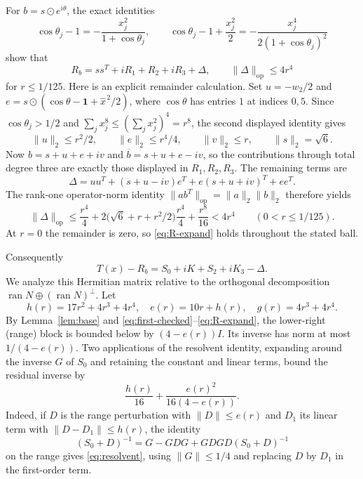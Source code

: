 \documentclass[11pt]{article}
\newcommand{\ran}{\operatorname{ran}}
\newcommand{\Op}{\mathrm{op}}
\begin{document}
For $b=s\odot e^{i\theta}$, the exact identities
\[
 \cos\theta_j-1=-\frac{x_j^2}{1+\cos\theta_j},\qquad
 \cos\theta_j-1+\frac{x_j^2}{2}
 =-\frac{x_j^4}{2(1+\cos\theta_j)^2}
\]
show that
\begin{equation}\label{eq:R-expand}
 R_b=ss^T+iR_1+R_2+iR_3+\Delta,
 \qquad\|\Delta\|_\Op\le4r^4
\end{equation}
for $r\le1/125$. Here is an explicit remainder calculation. Set
$u=-w_2/2$ and
$e=s\odot(\cos\theta-\mathbf1+\widehat x^{\,2}/2)$,
where $\cos\theta$ has entries $1$ at indices $0,5$.
Since $\cos\theta_j>1/2$ and $\sum_jx_j^8\le
(\sum_jx_j^2)^4=r^8$, the second displayed identity gives
\[
 \|u\|_2\le r^2/2,\qquad
 \|e\|_2\le r^4/4,\qquad
 \|v\|_2\le r,\qquad \|s\|_2=\sqrt6.
\]
Now $b=s+u+e+iv$ and $\overline b=s+u+e-iv$, so the
contributions through total degree three are exactly those displayed
in $R_1,R_2,R_3$. The remaining terms are
\[
 \Delta=uu^T+(s+u-iv)e^T+e(s+u+iv)^T+ee^T.
\]
The rank-one operator-norm identity $\|ab^T\|_\Op=\|a\|_2\|b\|_2$
therefore yields
\[
 \|\Delta\|_\Op
 \le \frac{r^4}{4}
 +2\bigl(\sqrt6+r+r^2/2\bigr)\frac{r^4}{4}
 +\frac{r^8}{16}<4r^4
 \qquad(0<r\le1/125).
\]
At $r=0$ the remainder is zero, so \eqref{eq:R-expand} holds
throughout the stated ball.

Consequently
\begin{equation}\label{eq:Schur-matrix}
 T(x)-R_b=S_0+iK+S_2+iK_3-\Delta.
\end{equation}
We analyze this Hermitian matrix relative to the orthogonal decomposition $\ran N\oplus(\ran N)^\perp$. Let
\begin{equation}\label{eq:error-def}
 h(r)=17r^2+4r^3+4r^4,\quad
 e(r)=10r+h(r),\quad g(r)=4r^3+4r^4.
\end{equation}
By Lemma~\ref{lem:base} and \eqref{eq:first-checked}--\eqref{eq:R-expand}, the lower-right (range) block is bounded below by $(4-e(r))I$. Its inverse has norm at most $1/(4-e(r))$. Two applications of the resolvent identity, expanding around the inverse $G$ of $S_0$ and retaining the constant and linear terms, bound the residual inverse by
\begin{equation}\label{eq:resolvent}
 \frac{h(r)}{16}+\frac{e(r)^2}{16(4-e(r))}.
\end{equation}
Indeed, if $D$ is the range perturbation with $\|D\|\le e(r)$ and $D_1$ its linear term with $\|D-D_1\|\le h(r)$, the identity
\[
 (S_0+D)^{-1}=G-GDG+GDG D(S_0+D)^{-1}
\]
on the range gives \eqref{eq:resolvent}, using $\|G\|\le1/4$ and replacing $D$ by $D_1$ in the first-order term.
\end{document}
